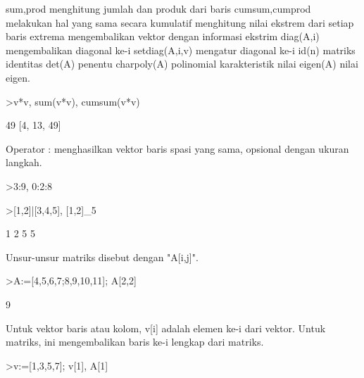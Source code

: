 \documentclass[a4paper,10pt]{article}
\begin{document}
\begin{eulernotebook}
\begin{eulercomment}
\begin{eulercomment}
\begin{eulercomment}
\begin{eulercomment}
\begin{eulercomment}
\end{eulercomment}
\begin{eulerttcomment}
 sum,prod menghitung jumlah dan produk dari baris 
 cumsum,cumprod melakukan hal yang sama secara kumulatif 
 menghitung nilai ekstrem dari setiap baris 
 extrema mengembalikan vektor dengan informasi ekstrim 
 diag(A,i) mengembalikan diagonal ke-i 
 setdiag(A,i,v) mengatur diagonal  ke-i 
 id(n) matriks identitas 
 det(A) penentu 
 charpoly(A) polinomial  karakteristik 
 nilai eigen(A) nilai eigen.
\end{eulerttcomment}
\begin{eulerprompt}
>v*v, sum(v*v), cumsum(v*v)
\end{eulerprompt}
\begin{euleroutput}
  [4,  9,  36]
  49
  [4,  13,  49]
\end{euleroutput}
\begin{eulercomment}
Operator : menghasilkan vektor baris spasi yang sama, opsional dengan
ukuran langkah.
\end{eulercomment}
\begin{eulerprompt}
>3:9, 0:2:8
\end{eulerprompt}
\begin{euleroutput}
  [3,  4,  5,  6,  7,  8,  9]
  [0,  2,  4,  6,  8]
\end{euleroutput}
\begin{eulerprompt}
>[1,2]|[3,4,5], [1,2]_5
\end{eulerprompt}
\begin{euleroutput}
  [1,  2,  3,  4,  5]
              1             2 
              5             5 
\end{euleroutput}
\begin{eulercomment}
Unsur-unsur matriks disebut dengan "A[i,j]".
\end{eulercomment}
\begin{eulerprompt}
>A:=[4,5,6,7;8,9,10,11]; A[2,2]
\end{eulerprompt}
\begin{euleroutput}
  9
\end{euleroutput}
\begin{eulercomment}
Untuk vektor baris atau kolom, v[i] adalah elemen ke-i dari vektor.
Untuk matriks, ini mengembalikan baris ke-i lengkap dari matriks.
\end{eulercomment}
\begin{eulerprompt}
>v:=[1,3,5,7]; v[1], A[1]
\end{eulerprompt}
\begin{euleroutput}

\end{euleroutput}
\end{eulercomment}
\end{eulercomment}
\end{eulercomment}
\end{eulercomment}
\end{eulernotebook}
\end{document}
